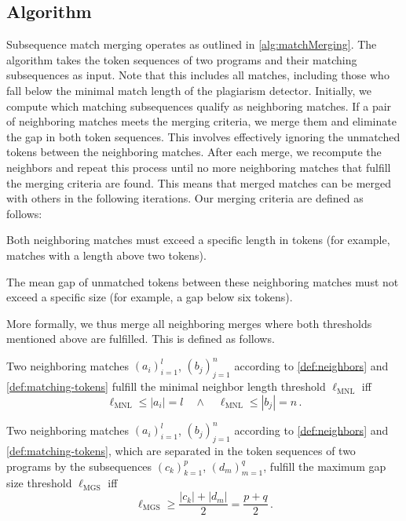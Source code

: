 \subsection{Algorithm}
\label{subsec:smm-algorithm}
Subsequence match merging operates as outlined in \autoref{alg:matchMerging}. The algorithm takes the token sequences of two programs and their matching subsequences as input. Note that this includes all matches, including those who fall below the minimal match length of the plagiarism detector. Initially, we compute which matching subsequences qualify as neighboring matches. If a pair of neighboring matches meets the merging criteria, we merge them and eliminate the gap in both token sequences.
This involves effectively ignoring the unmatched tokens between the neighboring matches. After each merge, we recompute the neighbors and repeat this process until no more neighboring matches that fulfill the merging criteria are found. This means that merged matches can be merged with others in the following iterations.
%
Our merging criteria are defined as follows:
\begin{description}[style=unboxed,leftmargin=0cm]
 \item[Minimal Neighbor Length:] Both neighboring matches must exceed a specific length in tokens (for example, matches with a length above two tokens).
 \item[Maximal Gap Size:] The mean gap of unmatched tokens between these neighboring matches must not exceed a specific size (for example, a gap below six tokens). 
\end{description}

More formally, we thus merge all neighboring merges where both thresholds mentioned above are fulfilled.
This is defined as follows.

\begin{theorem}\label{def:neighbor-length}
Two neighboring matches \((a_i)_{i=1}^l\), \((b_j)_{j=1}^n\) according to \autoref{def:neighbors} and \autoref{def:matching-tokens} fulfill the minimal neighbor length threshold \(\ell_{\text{MNL}}\) iff
\[
    \ell_{\text{MNL}} \leq |a_i| = l \quad \land \quad \ell_{\text{MNL}} \leq |b_j| = n \,.
\]
\end{theorem}

\begin{theorem}\label{def:gap-size}
Two neighboring matches \((a_i)_{i=1}^l\), \((b_j)_{j=1}^n\) according to \autoref{def:neighbors} and \autoref{def:matching-tokens}, which are separated in the token sequences of two programs by the subsequences \((c_k)_{k=1}^p\), \((d_m)_{m=1}^q\), fulfill the maximum gap size threshold \(\ell_{\text{MGS}}\) iff
\[
    \ell_{\text{MGS}} \geq \frac{|c_k| + |d_m|}{2} = \frac{p + q}{2} \,.
\]
\end{theorem}



